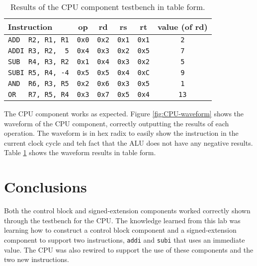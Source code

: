 \documentclass[11pt]{report}
\begin{document}
\begin{table}[ht!]
    \centering
    \begin{tabular}{|l||c|c|c|c|c|} 
     \hline
     Instruction & op & rd & rs & rt & value (of rd) \\
     \hline
     \verb|ADD  R2, R1, R1| & \verb|0x0| & \verb|0x2| & \verb|0x1| & \verb|0x1| & \verb|2| \\ 
     \hline                                                                             
     \verb|ADDI R3, R2,  5| & \verb|0x4| & \verb|0x3| & \verb|0x2| & \verb|0x5| & \verb|7| \\
     \hline                                                                             
     \verb|SUB  R4, R3, R2| & \verb|0x1| & \verb|0x4| & \verb|0x3| & \verb|0x2| & \verb|5| \\
     \hline                                                                             
     \verb|SUBI R5, R4, -4| & \verb|0x5| & \verb|0x5| & \verb|0x4| & \verb|0xC| & \verb|9| \\ 
     \hline                                                                             
     \verb|AND  R6, R3, R5| & \verb|0x2| & \verb|0x6| & \verb|0x3| & \verb|0x5| & \verb|1| \\
     \hline                                                                             
     \verb|OR   R7, R5, R4| & \verb|0x3| & \verb|0x7| & \verb|0x5| & \verb|0x4| & \verb|13| \\
     \hline
    \end{tabular}
    \caption{Results of the CPU component testbench in table form.}
    \label{table:CPU-waveform_table}
\end{table}

The CPU component works as expected. Figure \ref{fig:CPU-waveform} shows the waveform of the CPU
component, correctly outputting the results of each operation. The waveform is in hex radix to
easily show the instruction in the current clock cycle and teh fact that the ALU does not have any
negative results. Table \ref{table:CPU-waveform_table} shows the waveform results in table form.

\section*{Conclusions}
Both the control block and signed-extension components worked correctly shown through the testbench
for the CPU. The knowledge learned from this lab was learning how to construct a control block
component and a signed-extension component to support two instructions, \verb|addi| and \verb|subi|
that uses an immediate value. The CPU was also rewired to support the use of these components and
the two new instructions.
\end{document}
